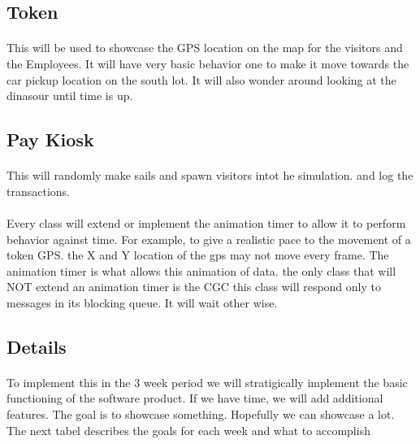 \documentclass[12pt]{article}
\begin{document}
\subsection{Token}
\paragraph{} This will be used to showcase the GPS location on the map for the visitors and the Employees. It will have very basic behavior one 
to make it move towards the car pickup location on the south lot. It will also wonder around looking at the dinasour until time is up.

\subsection{Pay Kiosk}
\paragraph{} This will randomly make sails and spawn visitors intot he simulation. and log the transactions.

\paragraph{}Every class will extend or implement the animation timer to allow it to perform behavior against time. For example, 
to give a realistic pace to the movement of a token GPS. the X and Y location of the gps may not move every frame. The animation timer is what allows this animation of data.
the only class that will NOT extend an animation timer is the CGC this class will respond only to messages in its blocking queue. It will wait other wise.

\subsection{Details}
\paragraph{}To implement this in the 3 week period we will stratigically implement the basic functioning of the software product. If we have time,
 we will add additional features. The goal is to showcase something. Hopefully we can showcase a lot. The next tabel describes the goals for each
 week and what to accomplish 
\end{document}
